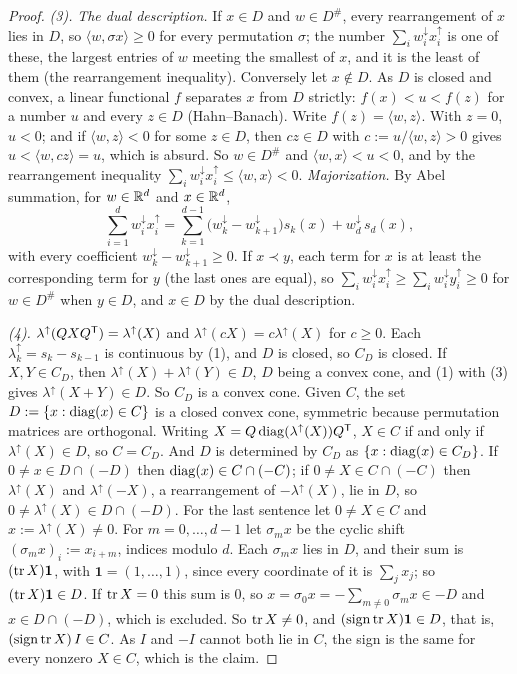 \begin{proof}
\emph{(3).} \emph{The dual description.} If $x \in D$ and $w \in D^\#$, every rearrangement of $x$ lies in
$D$, so $\langle w, \sigma x\rangle \ge 0$ for every permutation $\sigma$; the number
$\sum_iw^\downarrow_ix^\uparrow_i$ is one of these, the largest entries of $w$ meeting the smallest of $x$,
and it is the least of them (the rearrangement inequality). Conversely let $x \notin D$. As $D$ is closed
and convex, a linear functional $f$ separates $x$ from $D$ strictly: $f(x) < u < f(z)$ for a number $u$ and
every $z \in D$ (Hahn--Banach). Write $f(z) = \langle w, z\rangle$. With $z = 0$, $u < 0$; and if
$\langle w, z\rangle < 0$ for some $z \in D$, then $cz \in D$ with $c := u/\langle w, z\rangle > 0$ gives
$u < \langle w, cz\rangle = u$, which is absurd. So $w \in D^\#$ and $\langle w, x\rangle < u < 0$, and by
the rearrangement inequality $\sum_iw^\downarrow_ix^\uparrow_i \le \langle w, x\rangle < 0$.
\emph{Majorization.} By Abel summation, for $w \in \mathbb{R}^d$ and $x \in \mathbb{R}^d$,
\[
  \sum_{i=1}^dw^\downarrow_ix^\uparrow_i = \sum_{k=1}^{d-1}\bigl(w^\downarrow_k - w^\downarrow_{k+1}\bigr)s_k(x)
  + w^\downarrow_d\,s_d(x) ,
\]
with every coefficient $w^\downarrow_k - w^\downarrow_{k+1} \ge 0$. If $x \prec y$, each term for $x$ is at
least the corresponding term for $y$ (the last ones are equal), so
$\sum_iw^\downarrow_ix^\uparrow_i \ge \sum_iw^\downarrow_iy^\uparrow_i \ge 0$ for $w \in D^\#$ when
$y \in D$, and $x \in D$ by the dual description.

\emph{(4).} $\lambda^\uparrow(QXQ^{\mathsf{T}}) = \lambda^\uparrow(X)$ and $\lambda^\uparrow(cX) = c\lambda^\uparrow(X)$
for $c \ge 0$. Each $\lambda^\uparrow_k = s_k - s_{k-1}$ is continuous by (1), and $D$ is closed, so $C_D$
is closed. If $X, Y \in C_D$, then $\lambda^\uparrow(X) + \lambda^\uparrow(Y) \in D$, $D$ being a convex
cone, and (1) with (3) gives $\lambda^\uparrow(X+Y) \in D$. So $C_D$ is a convex cone. Given $C$, the set
$D := \{x : \operatorname{diag}(x) \in C\}$ is a closed convex cone, symmetric because permutation matrices are
orthogonal. Writing $X = Q\operatorname{diag}(\lambda^\uparrow(X))Q^{\mathsf{T}}$, $X \in C$ if and only if $\lambda^\uparrow(X)
\in D$, so $C = C_D$. And $D$ is determined by $C_D$ as $\{x : \operatorname{diag}(x) \in C_D\}$. If $0 \ne x \in D \cap
(-D)$ then $\operatorname{diag}(x) \in C \cap (-C)$; if $0 \ne X \in C \cap (-C)$ then $\lambda^\uparrow(X)$ and
$\lambda^\uparrow(-X)$, a rearrangement of $-\lambda^\uparrow(X)$, lie in $D$, so $0 \ne \lambda^\uparrow(X)
\in D \cap (-D)$. For the last sentence let $0 \ne X \in C$ and $x := \lambda^\uparrow(X) \ne 0$. For
$m = 0, \dots, d-1$ let $\sigma_mx$ be the cyclic shift $(\sigma_mx)_i := x_{i+m}$, indices modulo $d$.
Each $\sigma_mx$ lies in $D$, and their sum is $(\operatorname{tr} X)\mathbf 1$, with $\mathbf 1 = (1, \dots, 1)$, since
every coordinate of it is $\sum_jx_j$; so $(\operatorname{tr} X)\mathbf 1 \in D$. If $\operatorname{tr} X = 0$ this sum is $0$, so
$x = \sigma_0x = -\sum_{m\ne0}\sigma_mx \in -D$ and $x \in D \cap (-D)$, which is excluded. So $\operatorname{tr} X \ne 0$,
and $(\operatorname{sign}\operatorname{tr} X)\mathbf 1 \in D$, that is, $(\operatorname{sign}\operatorname{tr} X)\,I \in C$. As $I$ and
$-I$ cannot both lie in $C$, the sign is the same for every nonzero $X \in C$, which is the claim.


\end{proof}
